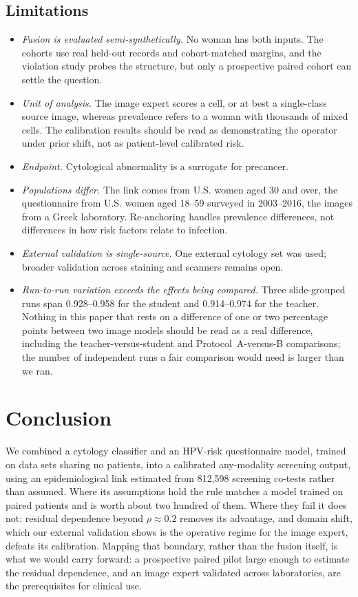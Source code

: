 \documentclass[lettersize,journal]{IEEEtran}
\begin{document}
\subsection{Limitations}
\label{sec:limits}
\begin{itemize}
\item \emph{Fusion is evaluated semi-synthetically.} No woman has both inputs. The cohorts use real held-out records and cohort-matched margins, and the violation study probes the structure, but only a prospective paired cohort can settle the question.
\item \emph{Unit of analysis.} The image expert scores a cell, or at best a single-class source image, whereas prevalence refers to a woman with thousands of mixed cells. The calibration results should be read as demonstrating the operator under prior shift, not as patient-level calibrated risk.
\item \emph{Endpoint.} Cytological abnormality is a surrogate for precancer.
\item \emph{Populations differ.} The link comes from U.S. women aged 30 and over, the questionnaire from U.S. women aged 18--59 surveyed in 2003--2016, the images from a Greek laboratory. Re-anchoring handles prevalence differences, not differences in how risk factors relate to infection.
\item \emph{External validation is single-source.} One external cytology set was used; broader validation across staining and scanners remains open.
\item \emph{Run-to-run variation exceeds the effects being compared.} Three slide-grouped runs span 0.928--0.958 for the student and 0.914--0.974 for the teacher. Nothing in this paper that rests on a difference of one or two percentage points between two image models should be read as a real difference, including the teacher-versus-student and Protocol~A-versus-B comparisons; the number of independent runs a fair comparison would need is larger than we ran.
\end{itemize}

\section{Conclusion}
We combined a cytology classifier and an HPV-risk questionnaire model, trained on data sets sharing no patients, into a calibrated any-modality screening output, using an epidemiological link estimated from 812,598 screening co-tests rather than assumed. Where its assumptions hold the rule matches a model trained on paired patients and is worth about two hundred of them. Where they fail it does not: residual dependence beyond $\rho\approx0.2$ removes its advantage, and domain shift, which our external validation shows is the operative regime for the image expert, defeats its calibration. Mapping that boundary, rather than the fusion itself, is what we would carry forward: a prospective paired pilot large enough to estimate the residual dependence, and an image expert validated across laboratories, are the prerequisites for clinical use.
\end{document}
